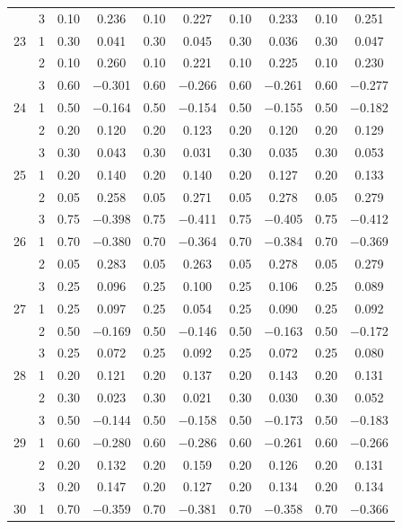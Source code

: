 \begin{longtable}{llcccccccc}
   & 3 & 0.10 & 0.236 & 0.10 & 0.227 & 0.10 & 0.233 & 0.10 & 0.251 \\ 
  23 & 1 & 0.30 & 0.041 & 0.30 & 0.045 & 0.30 & 0.036 & 0.30 & 0.047 \\ 
   & 2 & 0.10 & 0.260 & 0.10 & 0.221 & 0.10 & 0.225 & 0.10 & 0.230 \\ 
   & 3 & 0.60 & $-$0.301 & 0.60 & $-$0.266 & 0.60 & $-$0.261 & 0.60 & $-$0.277 \\ 
  24 & 1 & 0.50 & $-$0.164 & 0.50 & $-$0.154 & 0.50 & $-$0.155 & 0.50 & $-$0.182 \\ 
   & 2 & 0.20 & 0.120 & 0.20 & 0.123 & 0.20 & 0.120 & 0.20 & 0.129 \\ 
   & 3 & 0.30 & 0.043 & 0.30 & 0.031 & 0.30 & 0.035 & 0.30 & 0.053 \\ 
  25 & 1 & 0.20 & 0.140 & 0.20 & 0.140 & 0.20 & 0.127 & 0.20 & 0.133 \\ 
   & 2 & 0.05 & 0.258 & 0.05 & 0.271 & 0.05 & 0.278 & 0.05 & 0.279 \\ 
   & 3 & 0.75 & $-$0.398 & 0.75 & $-$0.411 & 0.75 & $-$0.405 & 0.75 & $-$0.412 \\ 
  26 & 1 & 0.70 & $-$0.380 & 0.70 & $-$0.364 & 0.70 & $-$0.384 & 0.70 & $-$0.369 \\ 
   & 2 & 0.05 & 0.283 & 0.05 & 0.263 & 0.05 & 0.278 & 0.05 & 0.279 \\ 
   & 3 & 0.25 & 0.096 & 0.25 & 0.100 & 0.25 & 0.106 & 0.25 & 0.089 \\ 
  27 & 1 & 0.25 & 0.097 & 0.25 & 0.054 & 0.25 & 0.090 & 0.25 & 0.092 \\ 
   & 2 & 0.50 & $-$0.169 & 0.50 & $-$0.146 & 0.50 & $-$0.163 & 0.50 & $-$0.172 \\ 
   & 3 & 0.25 & 0.072 & 0.25 & 0.092 & 0.25 & 0.072 & 0.25 & 0.080 \\ 
  28 & 1 & 0.20 & 0.121 & 0.20 & 0.137 & 0.20 & 0.143 & 0.20 & 0.131 \\ 
   & 2 & 0.30 & 0.023 & 0.30 & 0.021 & 0.30 & 0.030 & 0.30 & 0.052 \\ 
   & 3 & 0.50 & $-$0.144 & 0.50 & $-$0.158 & 0.50 & $-$0.173 & 0.50 & $-$0.183 \\ 
  29 & 1 & 0.60 & $-$0.280 & 0.60 & $-$0.286 & 0.60 & $-$0.261 & 0.60 & $-$0.266 \\ 
   & 2 & 0.20 & 0.132 & 0.20 & 0.159 & 0.20 & 0.126 & 0.20 & 0.131 \\ 
   & 3 & 0.20 & 0.147 & 0.20 & 0.127 & 0.20 & 0.134 & 0.20 & 0.134 \\ 
  30 & 1 & 0.70 & $-$0.359 & 0.70 & $-$0.381 & 0.70 & $-$0.358 & 0.70 & $-$0.366 \\ 

\end{longtable}

